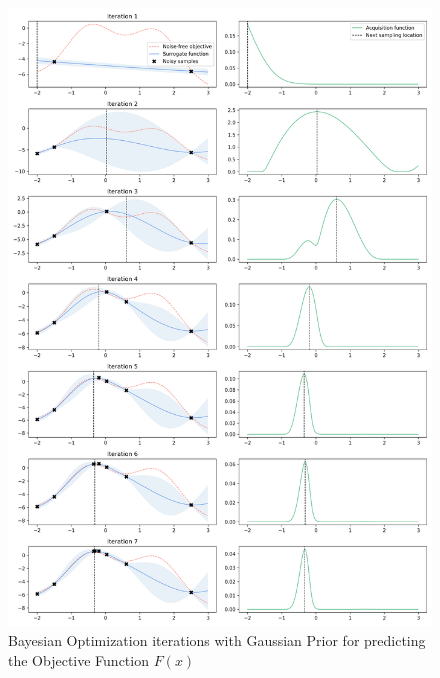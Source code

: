 \documentclass[12pt, a4paper]{article}
\begin{document}
\begin{figure}[!htpb]
    \centering
    \includegraphics[width=1\textwidth,trim={0 0 0 0},clip]{figures/bayesian_optimization_from_scratch_iterations.png}
    \caption[Bayesian Optimization Iterations]{Bayesian Optimization iterations with Gaussian Prior for predicting the Objective Function $F(x)$}
    \label{fig: bo_iterations}    
\end{figure}
\newpage
\end{document}
